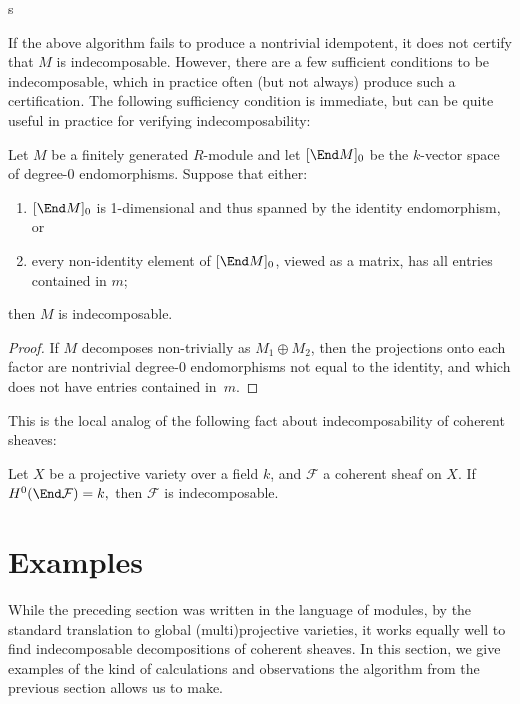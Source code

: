 s\documentclass{article}
\def\F{\mathcal F}
\numberwithin{equation}{section}
\theoremstyle{theorem}
\numberwithin{thm}{section}
\theoremstyle{definition}
\begin{document}
If the above algorithm fails to produce a nontrivial idempotent, it does not certify that $M$ is indecomposable. However, there are a few sufficient conditions to be indecomposable, which in practice often (but not always) produce such a certification.
The following sufficiency condition is immediate, but can be quite useful in practice for verifying indecomposability:

\begin{lem}
  Let $M$ be a finitely generated $R$-module and let $[\End M]_0$ be the $k$-vector space of degree-0 endomorphisms. Suppose that either:
  \begin{enumerate}
  \item $[\End M]_0$ is 1-dimensional and thus spanned by the identity endomorphism, or
  \item every non-identity element of $[\End M]_0$, viewed as a matrix, has all entries contained in $m$;
  \end{enumerate}
  then $M$ is indecomposable.
\end{lem}
\begin{proof}
  If $M$ decomposes non-trivially as $M_1\oplus M_2$, then the projections onto each factor are nontrivial degree-0 endomorphisms not equal to the identity, and which does not have entries contained in~$m$.
\end{proof}

This is the local analog of the following fact about indecomposability of coherent sheaves:

\begin{cor}
  Let $X$ be a projective variety over a field $k$, and $\F$ a coherent sheaf on $X$.
  If $ H^0(\End \F) = k, $ then $\F$ is indecomposable.
\end{cor}


\section{Examples}

While the preceding section was written in the language of modules, by the standard translation to global (multi)projective varieties, it works equally well to find indecomposable decompositions of coherent sheaves.
In this section, we give examples of the kind of calculations and observations the algorithm from the previous section allows us to make.

\renewcommand{\char}{\operatorname{char}}
\end{document}
